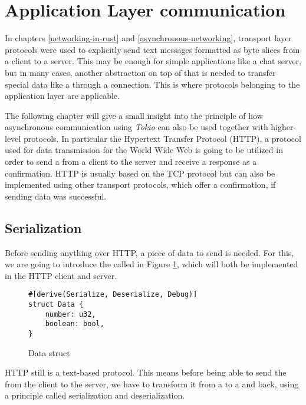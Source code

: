 
\section{Application Layer communication} \label{application-layer-communication}
In chapters \ref{networking-in-rust} and \ref{asynchronous-networking}, transport layer protocols were used to
explicitly send text messages formatted as byte slices from a client to a server. This may be enough for simple
applications like a chat server, but in many cases, another abstraction on top of that is needed to transfer special
data like a  through a connection. This is where protocols belonging to the application layer are
applicable.

The following chapter will give a small insight into the principle of how asynchronous communication using
\textit{Tokio} can also be used together with higher-level protocols. In particular the Hypertext Transfer Protocol
(HTTP), a protocol used for data transmission for the World Wide Web is going to be utilized in order to send a
 from a client to the server and receive a response as a confirmation. HTTP is usually based on the TCP
protocol but can also be implemented using other transport protocols, which offer a confirmation, if sending data was
successful.

\subsection{Serialization}
Before sending anything over HTTP, a piece of data to send is needed. For this, we are going to introduce the
 called  in Figure \ref{data-struct}, which will both be implemented in the HTTP client and
server.

\begin{figure}[ht]
    \begin{verbatim}
#[derive(Serialize, Deserialize, Debug)]
struct Data {
    number: u32,
    boolean: bool,
}
    \end{verbatim}
    \caption{Data struct}
    \label{data-struct}
\end{figure}

HTTP still is a text-based protocol. This means before being able to send the  from the client to the
server, we have to transform it from a  to a  and back, using a principle called
serialization and deserialization.


